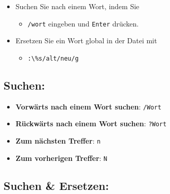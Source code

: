 \documentclass{vorlage-design-main}
\begin{document}
\begin{enumerate}
\begin{itemize}
  \item
    Suchen Sie nach einem Wort, indem Sie

    \begin{itemize}
    
    \item
      \verb|/wort| eingeben und
      \verb|Enter| drücken.
    \end{itemize}
  \item
    Ersetzen Sie ein Wort global in der Datei mit

    \begin{itemize}
    
    \item
      \verb|:\%s/alt/neu/g|
    \end{itemize}
  \end{itemize}
\end{enumerate}

\hypertarget{suchen}{%
\subsection{Suchen:}\label{suchen}}

\begin{itemize}

\item
  \textbf{Vorwärts nach einem Wort suchen}:
  \verb|/Wort|
\item
  \textbf{Rückwärts nach einem Wort suchen}:
  \verb|?Wort|
\item
  \textbf{Zum nächsten Treffer}: \verb|n|
\item
  \textbf{Zum vorherigen Treffer}: \verb|N|
\end{itemize}

\hypertarget{suchen-ersetzen}{%
\subsection{Suchen \& Ersetzen:}\label{suchen-ersetzen}}
\end{document}
